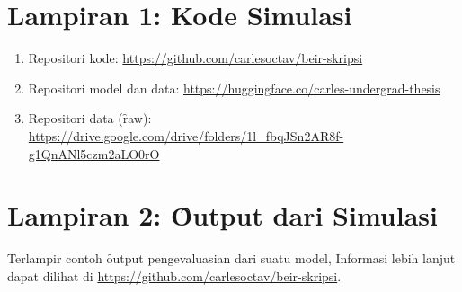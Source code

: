 \chapter*{Lampiran 1: Kode Simulasi}
\begin{enumerate}
    \item Repositori kode: \url{https://github.com/carlesoctav/beir-skripsi} 
    \item Repositori model dan data: \url{https://huggingface.co/carles-undergrad-thesis}
    \item Repositori data (\f{raw}): \url{https://drive.google.com/drive/folders/1l_fbqJSn2AR8f-g1QnANl5czm2aLO0rO}
\end{enumerate}



\newpage



\newpage



\newpage



\newpage

 

\newpage








\chapter*{Lampiran 2: \f{Output} dari Simulasi}
\label{appendix:output}
Terlampir contoh \f{output} pengevaluasian dari suatu model, Informasi lebih lanjut dapat dilihat di \url{https://github.com/carlesoctav/beir-skripsi}.

